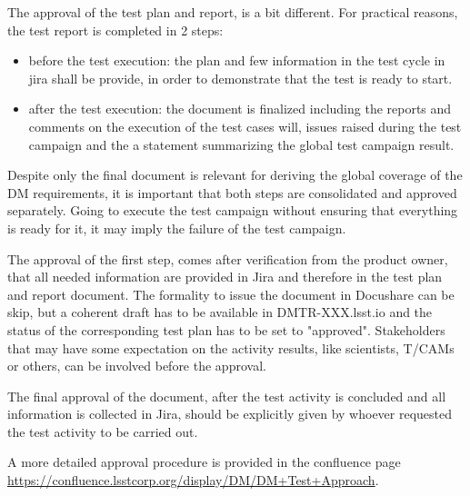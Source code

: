 The approval of the test plan and report, is a bit different.
For practical reasons, the test report is completed in 2 steps:

\begin{itemize}
\item before the test execution: the plan and few information in the test cycle in jira shall be provide, in order to demonstrate that the test is ready to start. 
\item after the test execution: the document is finalized including the reports and comments on the execution of the test cases will, issues raised during the test campaign  and the a statement summarizing the global test campaign result.
\end{itemize}

Despite only the final document is relevant for deriving the global coverage of the DM requirements, it is important that both steps are consolidated and approved separately. 
Going to execute the test campaign without ensuring that everything is ready for it, it may imply the failure of the test campaign. 

The approval of the first step, comes after verification from the product owner, that all needed information are provided in Jira and therefore in the test plan and report document. 
The formality to issue the document in Docushare can be skip, but a coherent draft has to be available in DMTR-XXX.lsst.io and the status of the corresponding test plan has to be set to "approved". 
Stakeholders that may have some expectation on the activity results, like scientists, T/CAMs or others, can be involved before the approval.

The final approval of the document, after the test activity is concluded and all information is collected in Jira, should be explicitly given by whoever requested the test activity to be carried out.


A more detailed approval procedure is provided in the confluence page \url{https://confluence.lsstcorp.org/display/DM/DM+Test+Approach}.




